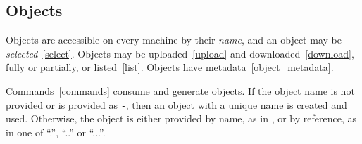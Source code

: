 \subsection{Objects}
\label{objects}

Objects are accessible on every machine by their \emph{name}, and an object may be \emph{selected}~\ref{select}. Objects may be uploaded~\ref{upload} and downloaded~\ref{download}, fully or partially, or listed~\ref{list}. Objects have metadata~\ref{object_metadata}.

Commands~\ref{commands} consume and generate objects. If the object name is not provided or is provided as \texttt{-}, then an object with a unique name is created and used. Otherwise, the object is either provided by name, as in , or by reference, as in one of ``.'', ``..'' or ``...''.
